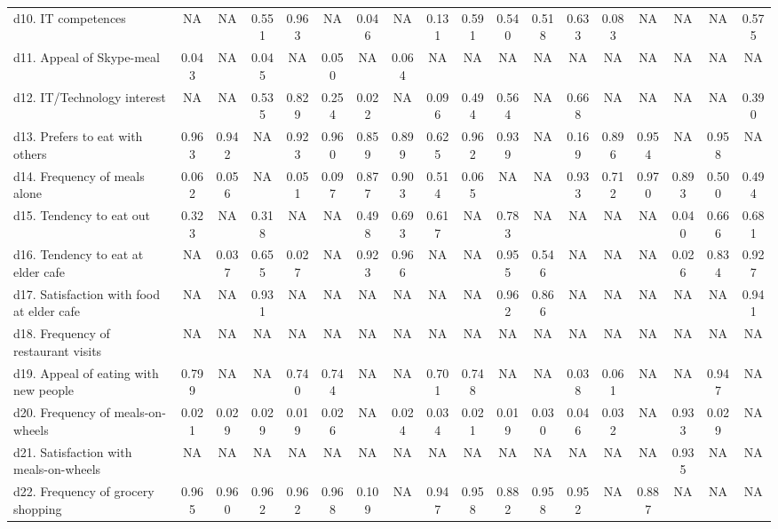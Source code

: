 \begin{table}
\begin{tabulary}{\linewidth}{LCCCCCCCCCCCCCCCCC}
d10. IT competences & NA    & NA    & 0.551 & 0.963 & NA    & 0.046 & NA    & 0.131 & 0.591 & 0.540 & 0.518 & 0.633 & 0.083 & NA    & NA    & NA    & 0.575 \\
d11. Appeal of Skype-meal & 0.043 & NA    & 0.045 & NA    & 0.050 & NA    & 0.064 & NA    & NA    & NA    & NA    & NA    & NA    & NA    & NA    & NA    & NA \\
d12. IT/Technology interest & NA    & NA    & 0.535 & 0.829 & 0.254 & 0.022 & NA    & 0.096 & 0.494 & 0.564 & NA    & 0.668 & NA    & NA    & NA    & NA    & 0.390 \\
d13. Prefers to eat with others & 0.963 & 0.942 & NA    & 0.923 & 0.960 & 0.859 & 0.899 & 0.625 & 0.962 & 0.939 & NA    & 0.169 & 0.896 & 0.954 & NA    & 0.958 & NA \\
d14. Frequency of meals alone & 0.062 & 0.056 & NA    & 0.051 & 0.097 & 0.877 & 0.903 & 0.514 & 0.065 & NA    & NA    & 0.933 & 0.712 & 0.970 & 0.893 & 0.500 & 0.494 \\
d15. Tendency to eat out & 0.323 & NA    & 0.318 & NA    & NA    & 0.498 & 0.693 & 0.617 & NA    & 0.783 & NA    & NA    & NA    & NA    & 0.040 & 0.666 & 0.681 \\
d16. Tendency to eat at elder cafe & NA    & 0.037 & 0.655 & 0.027 & NA    & 0.923 & 0.966 & NA    & NA    & 0.955 & 0.546 & NA    & NA    & NA    & 0.026 & 0.834 & 0.927 \\
d17. Satisfaction with food at elder cafe & NA    & NA    & 0.931 & NA    & NA    & NA    & NA    & NA    & NA    & 0.962 & 0.866 & NA    & NA    & NA    & NA    & NA    & 0.941 \\
d18. Frequency of restaurant visits & NA    & NA    & NA    & NA    & NA    & NA    & NA    & NA    & NA    & NA    & NA    & NA    & NA    & NA    & NA    & NA    & NA \\
d19. Appeal of eating with new people & 0.799 & NA    & NA    & 0.740 & 0.744 & NA    & NA    & 0.701 & 0.748 & NA    & NA    & 0.038 & 0.061 & NA    & NA    & 0.947 & NA \\
d20. Frequency of meals-on-wheels & 0.021 & 0.029 & 0.029 & 0.019 & 0.026 & NA    & 0.024 & 0.034 & 0.021 & 0.019 & 0.030 & 0.046 & 0.032 & NA    & 0.933 & 0.029 & NA \\
d21. Satisfaction with meals-on-wheels & NA    & NA    & NA    & NA    & NA    & NA    & NA    & NA    & NA    & NA    & NA    & NA    & NA    & NA    & 0.935 & NA    & NA \\
d22. Frequency of grocery shopping & 0.965 & 0.960 & 0.962 & 0.962 & 0.968 & 0.109 & NA    & 0.947 & 0.958 & 0.882 & 0.958 & 0.952 & NA    & 0.887 & NA    & NA    & NA \\

\end{tabulary}
\end{table}
